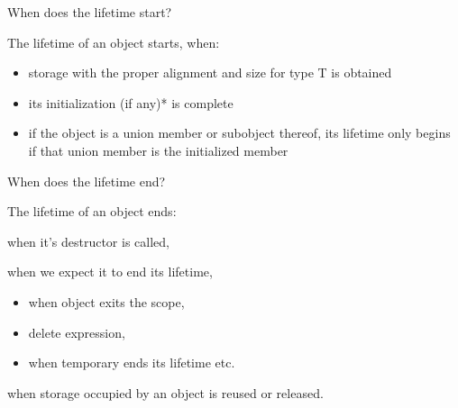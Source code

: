\documentclass{panicsoftware-presentation}
\makeatletter
\newenvironment{itemizeSeq}{\begin{itemize}[<+-|alert@+>]}{\end{itemize}}
\makeatother
\begin{document}
\begin{frame}{When does the lifetime start?}

\centerline{The lifetime of an object \alert{starts}, when:}

\begin{itemizeSeq}

\item storage with the proper alignment and size for type T is obtained
\item its initialization (if any)* is complete
\item if the object is a union member or subobject thereof, its lifetime only begins if that union member is the initialized member

\end{itemizeSeq}


\end{frame}

\begin{frame}{When does the lifetime end?}

\centerline{The lifetime of an object \alert{ends}:}

\begin{description}[<+-|alert@+>]

\item[class types] when it's destructor is called,
\item[non-class types] when we expect it to end its lifetime, 
\begin{itemize}
	\item when object exits the scope,
	\item delete expression,
	\item when temporary ends its lifetime etc.
\end{itemize}
\item[any type] when storage occupied by an object is reused or released.
\end{description}

\end{frame}
\end{document}
